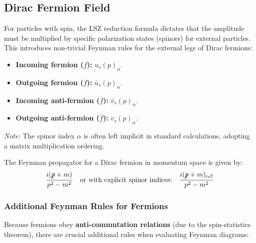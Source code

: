 \subsection{Dirac Fermion Field}

For particles with spin, the LSZ reduction formula dictates that the amplitude must be multiplied by specific polarization states (spinors) for external particles. This introduces non-trivial Feynman rules for the external legs of Dirac fermions:

\begin{itemize}
    \item \textbf{Incoming fermion (\(f\)):} \(u_s(p)_\alpha\).
    \item \textbf{Outgoing fermion (\(f\)):} \(\bar{u}_s(p)_\alpha\).
    \item \textbf{Incoming anti-fermion (\(\bar{f}\)):} \(\bar{v}_s(p)_\alpha\).
    \item \textbf{Outgoing anti-fermion (\(\bar{f}\)):} \(v_s(p)_\alpha\).
\end{itemize}
\textit{Note:} The spinor index \(\alpha\) is often left implicit in standard calculations, adopting a matrix multiplication ordering.

The Feynman propagator for a Dirac fermion in momentum space is given by:
\[
    \frac{i(\slashed{p} + m)}{p^2 - m^2} \quad \text{or with explicit spinor indices:} \quad \frac{i(\slashed{p} + m)_{\alpha\beta}}{p^2 - m^2}
\]

\subsubsection{Additional Feynman Rules for Fermions}

Because fermions obey \textbf{anti-commutation relations} (due to the spin-statistics theorem), there are crucial additional rules when evaluating Feynman diagrams:


